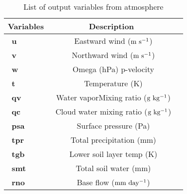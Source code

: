 \begin{table}[!]
\begin{center}
\caption{List of output variables from atmosphere}  \label{atmos_var}
\vspace{0.25cm}
\begin{tabular}{|l|c|l|} \hline \hline
{\small {\bf Variables}} & {\small {\bf Description}} \\ \hline \hline
{\ {\bf u}}    & {\ {Eastward wind (${\rm m~s^{-1}}$) } }      \\ \hline
{\ {\bf v}}    & {\ {Northward wind (${\rm m~s^{-1}}$)} }     \\ \hline
{\ {\bf w}}    & {\ {Omega (hPa) p-velocity}}       \\ \hline
{\ {\bf t}}    & {\ {Temperature (K)}}       \\ \hline
{\ {\bf qv}}    & {\ {Water vaporMixing ratio (${\rm g~kg^{-1}}$)} }      \\ \hline
{\ {\bf qc}}    & {\ {Cloud water mixing ratio (${\rm g~kg^{-1}}$)} }     \\ \hline
{\ {\bf psa}}    & {\ {Surface pressure (Pa)}}       \\ \hline
{\ {\bf tpr}}    & {\ {Total precipitation (mm)} }      \\ \hline
{\ {\bf tgb}}    & {\ {Lower soil layer temp (K)} }     \\ \hline
{\ {\bf smt}}    & {\ {Total soil water (mm)}}       \\ \hline
{\ {\bf rno}}    & {\ {Base flow (${\rm mm~day^{-1}}$)}}       \\ \hline
\end{tabular}
\end{center}
\end{table}

